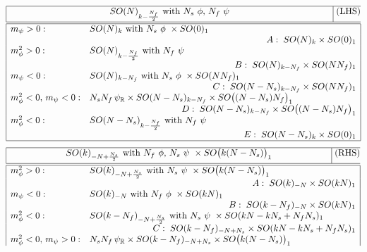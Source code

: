 \documentclass[a4paper, 12pt]{article}
\numberwithin{equation}{section}
\newcommand{\bR}{\mathbb{R}}
\begin{document}
\begin{table}[t!]
{\renewcommand{\arraystretch}{1.39}
$$
\begin{array}{|lll|}
\hline
\multicolumn{3}{|c|}{SO(N)_{k - \frac{N_f}2} \text{ with $N_s$ $\phi$, $N_f$ $\psi$}} \text{ (LHS)}\\[.5em]
\hline\hline
m_\psi>0: &	SO(N)_k \text{ with $N_s$ $\phi$ } \times SO(0)_1 & \qquad\qquad\qquad \\
	& \multicolumn{2}{r|}{A:\; SO(N)_k \times SO(0)_1} \\
m_\phi^2>0: &	SO(N)_{k-\frac{N_f}2} \text{ with $N_f$ $\psi$} & \\
	& \multicolumn{2}{r|}{B:\; SO(N)_{k-N_f} \times SO(NN_f)_1} \\
m_\psi<0: &	SO(N)_{k-N_f} \text{ with $N_s$ $\phi$ } \times SO(NN_f)_1 & \\
	& \multicolumn{2}{r|}{C:\; SO(N-N_s)_{k-N_f} \times SO(NN_f)_1} \\
m_\phi^2<0,\, m_\psi<0: & N_s N_f\, \psi_\bR \times SO(N-N_s)_{k-N_f} \times SO\big((N-N_s)N_f \big)_1 & \\
	& \multicolumn{2}{r|}{D:\; SO(N-N_s)_{k-N_f} \times SO\big( (N-N_s) N_f \big)_1} \\
m_\phi^2<0: &	SO(N-N_s)_{k - \frac{N_f}2} \text{ with $N_f$ $\psi$} & \\
	& \multicolumn{2}{r|}{E:\; SO(N-N_s)_k \times SO(0)_1} \\
\hline
\end{array}
$$
$$
\begin{array}{|lll|}
\hline
\multicolumn{3}{|c|}{SO(k)_{-N + \frac{N_s}2} \text{ with $N_f$ $\phi$, $N_s$ $\psi$ } \times SO\big( k(N-N_s) \big)_1} \text{ (RHS)}\\[.5em]
\hline\hline
m_\phi^2>0: & SO(k)_{-N + \frac{N_s}2} \text{ with $N_s$ $\psi$ } \times SO\big( k(N-N_s) \big)_1 & \;\;\qquad \\
	& \multicolumn{2}{r|}{A:\; SO(k)_{-N} \times SO(kN)_1} \\
m_\psi<0: &	SO(k)_{-N} \text{ with $N_f$ $\phi$ } \times SO(kN)_1 & \\
	& \multicolumn{2}{r|}{B:\; SO(k-N_f)_{-N} \times SO(kN)_1} \\
m_\phi^2<0: &	SO(k-N_f)_{-N + \frac{N_s}2} \text{ with $N_s$ $\psi$ } \times SO(kN - kN_s + N_fN_s)_1 & \\
	& \multicolumn{2}{r|}{C:\; SO(k-N_f)_{-N + N_s} \times SO(kN - kN_s + N_fN_s)_1} \\
m_\phi^2<0,\, m_\psi>0: & N_s N_f\, \psi_\bR \times SO(k-N_f)_{-N + N_s} \times SO\big( k(N-N_s) \big)_1 & \\

\end{array}$$}
\end{table}
\end{document}
